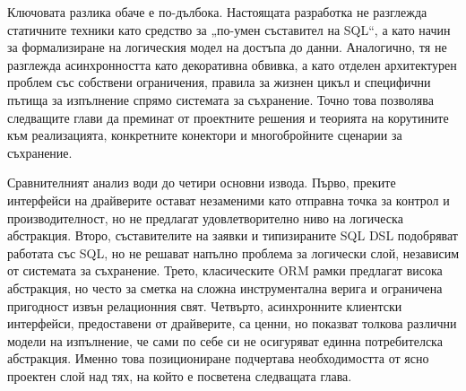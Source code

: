 Ключовата разлика обаче е по-дълбока. Настоящата разработка не разглежда статичните техники като средство за „по-умен съставител на SQL“, а като начин за формализиране на логическия модел на достъпа до данни. Аналогично, тя не разглежда асинхронността като декоративна обвивка, а като отделен архитектурен проблем със собствени ограничения, правила за жизнен цикъл и специфични пътища за изпълнение спрямо системата за съхранение. Точно това позволява следващите глави да преминат от проектните решения и теорията на корутините към реализацията, конкретните конектори и многобройните сценарии за съхранение.

Сравнителният анализ води до четири основни извода. Първо, преките интерфейси на драйверите остават незаменими като отправна точка за контрол и производителност, но не предлагат удовлетворително ниво на логическа абстракция. Второ, съставителите на заявки и типизираните SQL DSL подобряват работата със SQL, но не решават напълно проблема за логически слой, независим от системата за съхранение. Трето, класическите ORM рамки предлагат висока абстракция, но често за сметка на сложна инструментална верига и ограничена пригодност извън релационния свят. Четвърто, асинхронните клиентски интерфейси, предоставени от драйверите, са ценни, но показват толкова различни модели на изпълнение, че сами по себе си не осигуряват единна потребителска абстракция. Именно това позициониране подчертава необходимостта от ясно проектен слой над тях, на който е посветена следващата глава.
